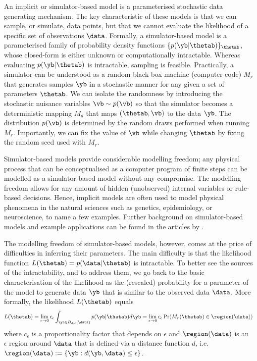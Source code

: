 An implicit or simulator-based model is a parameterised stochastic
data generating mechanism. The key characteristic of these models is
that we can sample, or simulate, data points, but that we cannot
evaluate the likelihood of a specific set of observations
$\data$. Formally, a simulator-based model is a parameterised family
of probability density functions $\{ p(\yb|\thetab) \}_{\thetab}$,
whose closed-form is either unknown or computationally
intractable. Whereas evaluating $p(\yb|\thetab)$ is intractable,
sampling is feasible. Practically, a simulator can be understood as a
random black-box machine (computer code) $M_r$ that generates samples
$\yb$ in a stochastic manner for any given a set of parameters
$\thetab$. We can isolate the randomness by introducing the stochastic
nuisance variables $\vb \sim p(\vb)$ so that the simulator becomes a
deterministic mapping $M_d$ that maps $(\thetab, \vb)$ to the data
$\yb$. The distribution $p(\vb)$ is determined by the random draws
performed when running $M_r$. Importantly, we can fix the value of
$\vb$ while changing $\thetab$ by fixing the random seed used with
$M_r$.

Simulator-based models provide considerable modelling freedom; any
physical process that can be conceptualised as a computer program of
finite steps can be modelled as a simulator-based model without any
compromise. The modelling freedom allows for any amount of hidden
(unobserved) internal variables or rule-based decisions. Hence,
implicit models are often used to model physical phenomena in the
natural sciences such as genetics, epidemiology, or neuroscience, to
name a few examples. Further background on simulator-based models and
example applications can be found in the articles
by \citet{Gutmann2016, Lintusaari2017, Sisson2018, Cranmer2020}.


The modelling freedom of simulator-based models, however, comes at the
price of difficulties in inferring their parameters. The main
difficulty is that the likelihood function $L(\thetab) =
p(\data|\thetab)$ is intractable. To better see the sources of the
intractability, and to address them, we go back to the basic
characterisation of the likelihood as the (rescaled) probability for a
parameter of the model to generate data $\yb$ that is similar to the
observed data $\data$. More formally, the likelihood $L(\thetab)$
equals
\begin{equation} \label{eq:likelihood}
  L(\thetab) = \lim_{\epsilon \to 0} c_\epsilon \int_{\yb \in B_{d,\epsilon}(\data)} p(\yb|\thetab)d\yb =
  \lim_{\epsilon \to 0} c_\epsilon \Pr(M_r(\thetab) \in \region(\data))
\end{equation}
where $c_\epsilon$ is a proportionality factor that depends on
$\epsilon$ and $\region(\data)$ is an $\epsilon$ region around $\data$
that is defined via a distance function $d$, i.e.\ $\region(\data)
:= \{\yb: d(\yb, \data) \leq \epsilon \}$. 


